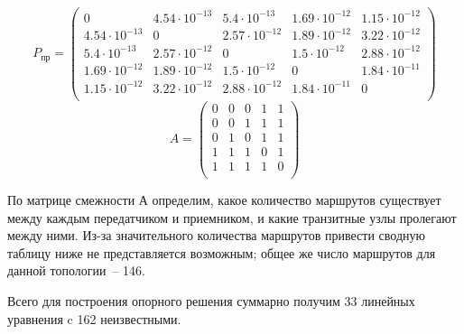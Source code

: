 \documentclass[14pt,a4paper,titlepage]{extarticle}
\begin{document}
\begin{equation}
P_\textit{пр} = 
\begin{pmatrix}
0 & 4.54 \cdot 10^{-13} & 5.4 \cdot 10^{-13} & 1.69 \cdot 10^{-12} & 1.15 \cdot 10^{-12} \\
4.54 \cdot 10^{-13} & 0 & 2.57 \cdot 10^{-12} & 1.89 \cdot 10^{-12} & 3.22 \cdot 10^{-12} \\
5.4 \cdot 10^{-13} & 2.57 \cdot 10^{-12} & 0 & 1.5 \cdot 10^{-12} & 2.88 \cdot 10^{-12} \\
1.69 \cdot 10^{-12} & 1.89 \cdot 10^{-12} & 1.5 \cdot 10^{-12} & 0 & 1.84 \cdot 10^{-11} \\
1.15 \cdot 10^{-12} & 3.22 \cdot 10^{-12} & 2.88 \cdot 10^{-12} & 1.84 \cdot 10^{-11} & 0 \\
\end{pmatrix}
\end{equation}
\begin{equation}
A = 
\begin{pmatrix}
0 & 0 & 0 & 1 & 1 \\
0 & 0 & 1 & 1 & 1 \\
0 & 1 & 0 & 1 & 1 \\
1 & 1 & 1 & 0 & 1 \\
1 & 1 & 1 & 1 & 0 \\
\end{pmatrix}
\end{equation}

По матрице смежности А определим, какое количество маршрутов существует между каждым передатчиком и приемником, и какие транзитные узлы пролегают между ними. Из-за значительного количества маршрутов привести сводную таблицу ниже не представляется возможным; общее же число маршрутов для данной топологии~-- 146.

Всего для построения опорного решения суммарно получим 33 линейных уравнения c 162 неизвестными. 
\end{document}
